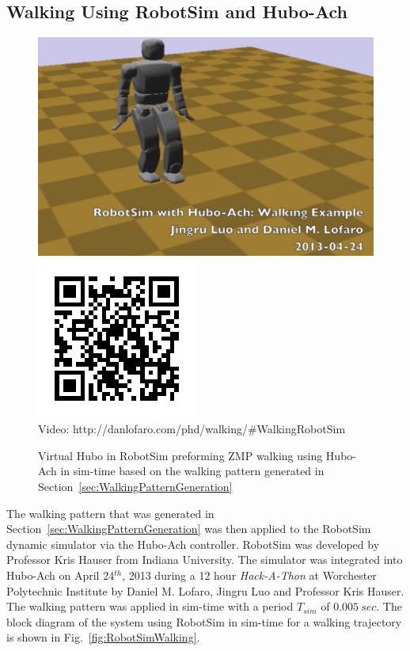 \subsection{Walking Using RobotSim and Hubo-Ach}\label{sec:RobotSimWalking}
\begin{figure}[thpb]
  \centering
\includegraphics[width=0.6\columnwidth]{./examples/pix/robotsim-walking.png}
\includegraphics[width=0.3\columnwidth]{./qrcode/qrcode-robotsim-walking.png}\\
      Video: http://danlofaro.com/phd/walking/\#WalkingRobotSim
  \caption{Virtual Hubo in RobotSim preforming ZMP walking using Hubo-Ach in sim-time based on the walking pattern generated in Section~\ref{sec:WalkingPatternGeneration}}
  \label{fig:robotSimWalkingVideo}
\end{figure}

The walking pattern that was generated in Section~\ref{sec:WalkingPatternGeneration} was then applied to the RobotSim dynamic simulator via the Hubo-Ach controller.
RobotSim was developed by Professor Kris Hauser from Indiana University.
The simulator was integrated into Hubo-Ach on April 24$^{th}$, 2013 during a 12 hour \textit{Hack-A-Thon} at Worchester Polytechnic Institute by Daniel M. Lofaro, Jingru Luo and Professor Kris Hauser\cite{wpiHackathon}.
The walking pattern was applied in sim-time with a period $T_{sim}$ of $0.005~sec$.
The block diagram of the system using RobotSim in sim-time for a walking trajectory is shown in Fig.~\ref{fig:RobotSimWalking}.



